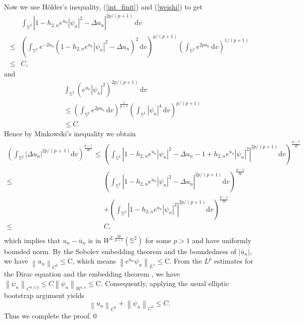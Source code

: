 \documentclass[a4paper, 12pt]{article}
\begin{document}
Now we use  H\"older's inequality, (\ref{int_finit}) and (\ref{weishi}) to get
\begin{equation*}
	\begin{aligned}
		& \int_{\mathbb{S}^2}\left| 1 -{h_{2,n}}{e^{u_n}}{\left| \psi_n  \right|^2}-\Delta u_n\right| ^{2p/(p+1)} \, {\text{d}{v}}\\
		\leq &\left( \int_{\mathbb{S}^2} e^{-2 u_n} (1-{h_{2,n}}{e^{u_n}}{\left| \psi_n  \right|^2} -\Delta u_n)^2 \, {\text{d}{v}} \right)^{p/(p+1)} \left( \int_{\mathbb{S}^2} e^{2 p u_n} \, {\text{d}{v}} \right)^{1/(p+1)}\\
		\leq& C,
\end{aligned}			\end{equation*}
and
\begin{equation*}
	\begin{aligned}
		& \int_{\mathbb{S}^2}(e^{u_n}|\psi_n|^2)^{2p/(p+1)} \, {\text{d}{v}}\\
		& \leq \left( \int_{\mathbb{S}^2} e^{2p u_n} \, {\text{d}{v}}\right )^{\frac 1{p+1}} \left( \int_{\mathbb{S}^2}|\psi_n|^4 \, {\text{d}{v}} \right)^{p/(p+1)}\\
		& \leq C.
\end{aligned}			\end{equation*}
Hence by Minkowski's inequality we obtain
\[
\begin{aligned}
	{\left( {\int_{{\mathbb{S}^2}} {{{\left| {\Delta {u_n}} \right|}^{2p/\left( {{\text{p + }}1} \right)}}} {\text{d}}v} \right)^{\frac{{p - 1}}{{2p}}}} \leq  & {\left( {\int_{{\mathbb{S}^2}} {{{\left| {1 - {h_{2,n}}{e^{{u_n}}}{{\left| {{\psi _n}} \right|}^2} - \Delta {u_n} - 1 + {h_{2,n}}{e^{{u_n}}}{{\left| {{\psi _n}} \right|}^2}} \right|}^{2p/(p + 1)}}} {\text{d}}v} \right)^{\frac{{p - 1}}{{2p}}}}  \\
	\leq& {\left( {\int_{{\mathbb{S}^2}} {{{\left| {1 - {h_{2,n}}{e^{{u_n}}}{{\left| {{\psi _n}} \right|}^2} - \Delta {u_n}} \right|}^{2p/(p + 1)}}} {\text{d}}v} \right)^{\frac{{p - 1}}{{2p}}}} \\
	& + {\left( {\int_{{\mathbb{S}^2}} {{{\left| {1 - {h_{2,n}}{e^{{u_n}}}{{\left| {{\psi _n}} \right|}^2}} \right|}^{2p/(p + 1)}}} {\text{d}}v} \right)^{\frac{{p - 1}}{{2p}}}}  \\
	\leq& C,  \\
\end{aligned}
\]
which implies that $u_n-\bar{u}_n$ is in $W^{2,\frac {2p}{p+1}}(\mathbb{S}^2)$ for some $p>1$ and have uniformly bounded norm. By the Sobolev embedding theorem and the boundedness of \(|\bar u_n|\), we have ${\left\| {{u_n}} \right\|_{{C^0}}} \leq {\text{C}}$, which means ${\left\| {{e^{{u_n}}}{\psi _n}} \right\|_{{L^4}}} \leq {\text{C}}.$ From the \(L^p\) estimates \cite[Theorem 3.2.3]{ammann2003variational} for the Dirac equation and the embedding theorem \cite[Theorem 3.3.2, Theorem 3.3.5]{ammann2003variational}, we have ${\left\| {{\psi _n}} \right\|_{{C^{0,1/2}}}} \leq C{\left\| {{\psi _n}} \right\|_{{W^{1,4}}}} \leq {\text{C}}$. Consequently, applying the usual elliptic bootstrap argument yields \[{\left\| {{u_n}} \right\|_{{C^k}}} + {\left\| {{\psi _n}} \right\|_{{C^k}}} \leq C.\]  Thus we complete the proof.\qed
\end{document}
